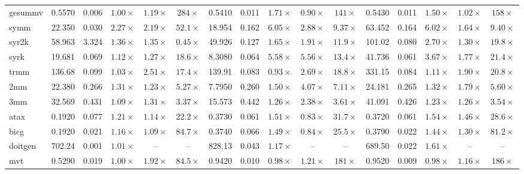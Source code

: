 \begin{table}[tbp]
{\begin{tabular}{lccccccccccccccc}
gesummv & 0.5570 & 0.006 & \(1.00\times\) & \(1.19\times\) & \(284\times\) & 0.5410 & 0.011 & \(1.71\times\) & \(0.90\times\) & \(141\times\) & 0.5430 & 0.011 & \(1.50\times\) & \(1.02\times\) & \(158\times\) \\
symm & 22.350 & 0.030 & \(2.27\times\) & \(2.19\times\) & \(52.1\times\) & 18.954 & 0.162 & \(6.05\times\) & \(2.88\times\) & \(9.37\times\) & 63.452 & 0.164 & \(6.02\times\) & \(1.64\times\) & \(9.40\times\) \\
syr2k & 58.963 & 3.324 & \(1.36\times\) & \(1.35\times\) & \(0.45\times\) & 49.926 & 0.127 & \(1.65\times\) & \(1.91\times\) & \(11.9\times\) & 101.02 & 0.080 & \(2.70\times\) & \(1.30\times\) & \(19.8\times\) \\
syrk & 19.681 & 0.069 & \(1.12\times\) & \(1.27\times\) & \(18.6\times\) & 8.3080 & 0.064 & \(5.58\times\) & \(5.56\times\) & \(13.4\times\) & 41.736 & 0.061 & \(3.67\times\) & \(1.77\times\) & \(21.4\times\) \\
trmm & 136.68 & 0.099 & \(1.03\times\) & \(2.51\times\) & \(17.4\times\) & 139.91 & 0.083 & \(0.93\times\) & \(2.69\times\) & \(18.8\times\) & 331.15 & 0.084 & \(1.11\times\) & \(1.90\times\) & \(20.8\times\) \\
2mm & 22.380 & 0.266 & \(1.31\times\) & \(1.23\times\) & \(5.27\times\) & 7.7950 & 0.260 & \(1.50\times\) & \(4.07\times\) & \(7.11\times\) & 24.181 & 0.265 & \(1.32\times\) & \(1.79\times\) & \(5.60\times\) \\
3mm & 32.569 & 0.431 & \(1.09\times\) & \(1.31\times\) & \(3.37\times\) & 15.573 & 0.442 & \(1.26\times\) & \(2.38\times\) & \(3.61\times\) & 41.091 & 0.426 & \(1.23\times\) & \(1.26\times\) & \(3.54\times\) \\
atax & 0.1920 & 0.077 & \(1.21\times\) & \(1.14\times\) & \(22.2\times\) & 0.3730 & 0.061 & \(1.51\times\) & \(0.83\times\) & \(31.7\times\) & 0.3720 & 0.061 & \(1.54\times\) & \(1.46\times\) & \(28.6\times\) \\
bicg & 0.1920 & 0.021 & \(1.16\times\) & \(1.09\times\) & \(84.7\times\) & 0.3740 & 0.066 & \(1.49\times\) & \(0.84\times\) & \(25.5\times\) & 0.3790 & 0.022 & \(1.44\times\) & \(1.30\times\) & \(81.2\times\) \\
doitgen & 702.24 & 0.001 & \(1.01\times\) & -- & -- & 828.13 & 0.043 & \(1.17\times\) & -- & -- & 689.50 & 0.022 & \(1.61\times\) & -- & -- \\
mvt & 0.5290 & 0.019 & \(1.00\times\) & \(1.92\times\) & \(84.5\times\) & 0.9420 & 0.010 & \(0.98\times\) & \(1.21\times\) & \(181\times\) & 0.9520 & 0.009 & \(0.98\times\) & \(1.16\times\) & \(186\times\) \\

\end{tabular}}
\end{table}
